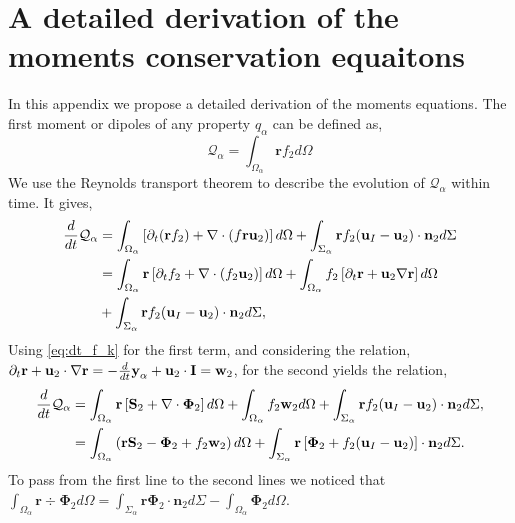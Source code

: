 \section{A detailed derivation of the moments conservation equaitons}
\label{ap:moment_derivative}
In this appendix we propose a detailed derivation of the moments equations. 
The first moment or dipoles of any property $q_\alpha$ can be defined as,
\begin{equation*}
    \mathcal{Q}_\alpha 
    = \int_{\Omega_\alpha} \textbf{r} f_2 d\Omega
\end{equation*}
We use the Reynolds transport theorem to describe the evolution of $\mathcal{Q}_\alpha$ within time. 
It gives, 
\begin{align*}
    \frac{d}{d t} \mathcal{Q}_\alpha
      &=  \int_{\Omega_\alpha} \left[
        \partial_t(\textbf{r}  f_2)
        + \mathbf{\nabla}\cdot \left(f \textbf{r} \textbf{u}_2\right)
    \right]d\Omega + \int_{\Sigma_\alpha} \textbf{r}  f_2  (\textbf{u}_I-\textbf{u}_2)\cdot \textbf{n}_2  d\Sigma  \nonumber \\
    &=  \int_{\Omega_\alpha} \textbf{r}\left[
        \partial_t f_2
        + \mathbf{\nabla}\cdot \left(f_2 \textbf{u}_2\right)
    \right] d\Omega
    + \int_{\Omega_\alpha} f_2 \left[
        \partial_t \textbf{r}
        +\textbf{u}_2 \mathbf{\nabla} \textbf{r}
    \right]d\Omega\\
    &+ \int_{\Sigma_\alpha} \textbf{r}  f_2 (\textbf{u}_I-\textbf{u}_2)\cdot \textbf{n}_2  d\Sigma,
\end{align*}
Using \ref{eq:dt_f_k} for the first term, and considering the relation,
$  \partial_t \textbf{r}
+ \textbf{u}_2 \cdot \mathbf{\nabla} \textbf{r}
= - \frac{d}{dt} \textbf{y}_\alpha  + \textbf{u}_2 \cdot \textbf{I}
= \textbf{w}_2$,
for the second yields the relation,
\begin{align*}
    \frac{d}{d t} \mathcal{Q}_\alpha
    &= \int_{\Omega_\alpha} \textbf{r} \left[
         \textbf{S}_2 +  \mathbf{\nabla}\cdot \mathbf{\Phi}_2
    \right]d\Omega
    +\int_{\Omega_\alpha} f_2  \textbf{w}_2 d\Omega
    + \int_{\Sigma_\alpha} \textbf{r}  f_2 (\textbf{u}_I-\textbf{u}_2)\cdot \textbf{n}_2  d\Sigma,\\
    &= \int_{\Omega_\alpha} \left( 
        \textbf{r} \textbf{S}_2 
        - \mathbf{\Phi}_2
        + f_2  \textbf{w}_2 
    \right) d\Omega
    + \int_{\Sigma_\alpha} \textbf{r} \left[
        \mathbf{\Phi}_2
        + f_2 (\textbf{u}_I-\textbf{u}_2)
    \right]\cdot \textbf{n}_2  d\Sigma.
\end{align*}
To pass from the first line to the second lines we noticed that $\int_{\Omega_\alpha} \textbf{r}  \div \mathbf{\Phi}_2 d\Omega
= \int_{\Sigma_\alpha} \textbf{r} \mathbf{\Phi}_2 \cdot \textbf{n}_2 d\Sigma
- \int_{\Omega_\alpha} \mathbf{\Phi}_2 d\Omega$. 


